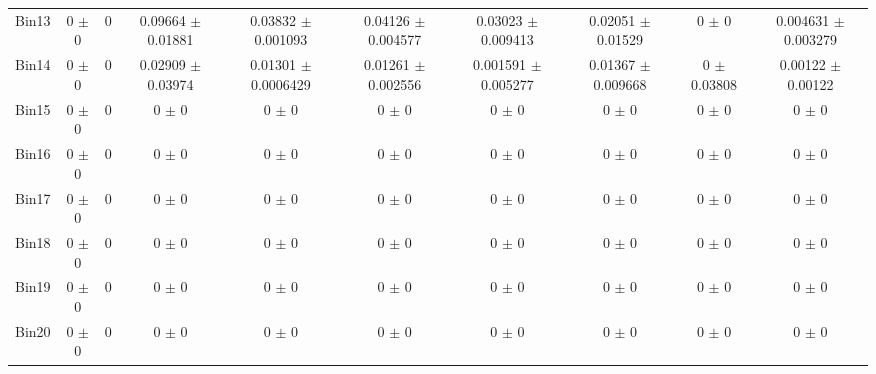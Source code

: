 \begin{tabular}{@{\extracolsep{4pt}}lccccccccc@{}}
     Bin13 & 0 $\pm$ 0 & 0 & 0.09664 $\pm$ 0.01881 & 0.03832 $\pm$ 0.001093 & 0.04126 $\pm$ 0.004577 & 0.03023 $\pm$ 0.009413 & 0.02051 $\pm$ 0.01529 & 0 $\pm$ 0 & 0.004631 $\pm$ 0.003279 \\ 
     Bin14 & 0 $\pm$ 0 & 0 & 0.02909 $\pm$ 0.03974 & 0.01301 $\pm$ 0.0006429 & 0.01261 $\pm$ 0.002556 & 0.001591 $\pm$ 0.005277 & 0.01367 $\pm$ 0.009668 & 0 $\pm$ 0.03808 & 0.00122 $\pm$ 0.00122 \\ 
     Bin15 & 0 $\pm$ 0 & 0 & 0 $\pm$ 0 & 0 $\pm$ 0 & 0 $\pm$ 0 & 0 $\pm$ 0 & 0 $\pm$ 0 & 0 $\pm$ 0 & 0 $\pm$ 0 \\ 
     Bin16 & 0 $\pm$ 0 & 0 & 0 $\pm$ 0 & 0 $\pm$ 0 & 0 $\pm$ 0 & 0 $\pm$ 0 & 0 $\pm$ 0 & 0 $\pm$ 0 & 0 $\pm$ 0 \\ 
     Bin17 & 0 $\pm$ 0 & 0 & 0 $\pm$ 0 & 0 $\pm$ 0 & 0 $\pm$ 0 & 0 $\pm$ 0 & 0 $\pm$ 0 & 0 $\pm$ 0 & 0 $\pm$ 0 \\ 
     Bin18 & 0 $\pm$ 0 & 0 & 0 $\pm$ 0 & 0 $\pm$ 0 & 0 $\pm$ 0 & 0 $\pm$ 0 & 0 $\pm$ 0 & 0 $\pm$ 0 & 0 $\pm$ 0 \\ 
     Bin19 & 0 $\pm$ 0 & 0 & 0 $\pm$ 0 & 0 $\pm$ 0 & 0 $\pm$ 0 & 0 $\pm$ 0 & 0 $\pm$ 0 & 0 $\pm$ 0 & 0 $\pm$ 0 \\ 
     Bin20 & 0 $\pm$ 0 & 0 & 0 $\pm$ 0 & 0 $\pm$ 0 & 0 $\pm$ 0 & 0 $\pm$ 0 & 0 $\pm$ 0 & 0 $\pm$ 0 & 0 $\pm$ 0 \\ 
\hline\hline
  \end{tabular}
